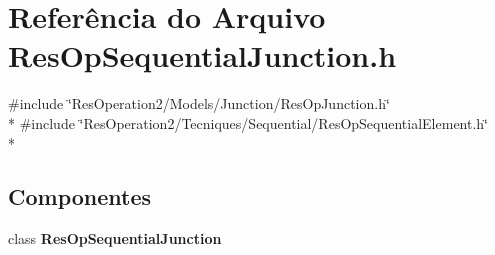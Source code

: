 \section{Referência do Arquivo Res\+Op\+Sequential\+Junction.\+h}
\label{_res_op_sequential_junction_8h}
{\ttfamily \#include \char`\"{}Res\+Operation2/\+Models/\+Junction/\+Res\+Op\+Junction.\+h\char`\"{}}\\*
{\ttfamily \#include \char`\"{}Res\+Operation2/\+Tecniques/\+Sequential/\+Res\+Op\+Sequential\+Element.\+h\char`\"{}}\\*
\subsection*{Componentes}
\begin{DoxyCompactItemize}
\item 
class {\bf Res\+Op\+Sequential\+Junction}
\end{DoxyCompactItemize}
